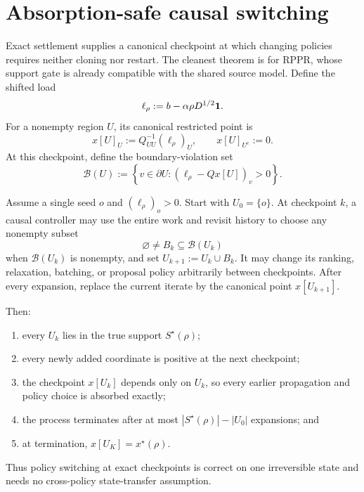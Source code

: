 \section{Absorption-safe causal switching}
\label{sec:absorption-switching}

Exact settlement supplies a canonical checkpoint at which changing policies
requires neither cloning nor restart.  The cleanest theorem is for RPPR,
whose support gate is already compatible with the shared source model.
Define the shifted load
\begin{equation}
 \ell_\rho:=b-\alpha\rho D^{1/2}\mathbf{1}.
 \label{eq:adaptive-shifted-load}
\end{equation}
For a nonempty region $U$, its canonical restricted point is
\begin{equation}
 x[U]_U:=Q_{UU}^{-1}(\ell_\rho)_U,
 \qquad
 x[U]_{U^c}:=0.
 \label{eq:adaptive-canonical-point}
\end{equation}
At this checkpoint, define the boundary-violation set
\begin{equation}
 \mathcal B(U):=
 \left\{v\in\partial U:
  (\ell_\rho-Qx[U])_v>0
 \right\}.
 \label{eq:adaptive-boundary-violations}
\end{equation}

\begin{theorem}
\label{thm:absorption-safe-switch}
Assume a single seed $o$ and $(\ell_\rho)_o>0$.  Start with $U_0=\{o\}$.
At checkpoint $k$, a causal controller may use the entire work and revisit
history to choose any nonempty subset
\begin{equation}
 \varnothing\neq B_k\subseteq\mathcal B(U_k)
 \label{eq:adaptive-subset}
\end{equation}
when $\mathcal B(U_k)$ is nonempty, and set
$U_{k+1}:=U_k\cup B_k$.  It may change its ranking, relaxation, batching, or
proposal policy arbitrarily between checkpoints.  After every expansion,
replace the current iterate by the canonical point $x[U_{k+1}]$.

Then:
\begin{enumerate}[label=(\roman*),leftmargin=*]
 \item every $U_k$ lies in the true support $S^\star(\rho)$;
 \item every newly added coordinate is positive at the next checkpoint;
 \item the checkpoint $x[U_k]$ depends only on $U_k$, so every earlier
 propagation and policy choice is absorbed exactly;
 \item the process terminates after at most
 $|S^\star(\rho)|-|U_0|$ expansions; and
 \item at termination, $x[U_K]=x^\star(\rho)$.
\end{enumerate}
Thus policy switching at exact checkpoints is correct on one irreversible
state and needs no cross-policy state-transfer assumption.
\end{theorem}

